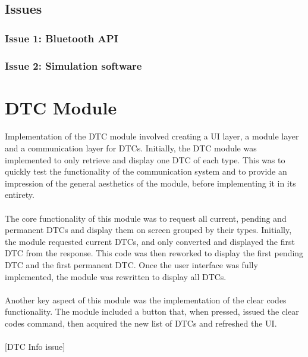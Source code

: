 	\subsection{Issues}
		\subsubsection{Issue 1: Bluetooth API}{
		}
		\label{ssec:BluetoothAPI}
		\subsubsection{Issue 2: Simulation software}{
		}
		\label{ssec:SimSoftware}		

\section{DTC Module}
		\paragraph{}{
		Implementation of the DTC module involved creating a UI layer, a module layer and a communication layer for DTCs.	Initially, the DTC module was implemented to only retrieve and display one DTC of each type. This was to quickly test the functionality of the communication system and to provide an impression of the general aesthetics of the module, before implementing it in its entirety.
		}		
		\paragraph{}{
		The core functionality of this module was to request all current, pending and permanent DTCs and display them on screen grouped by their types. Initially, the module requested current DTCs, and only converted and displayed the first DTC from the response. This code was then reworked to display the first pending DTC and the first permanent DTC. Once the user interface was fully implemented, the module was rewritten to display all DTCs.
		}
		\paragraph{}{
		Another key aspect of this module was the implementation of the clear codes functionality. The module included a button that, when pressed, issued the clear codes command, then acquired the new list of DTCs and refreshed the UI.
		}
		\paragraph{}{
		[DTC Info issue]
		}
		
